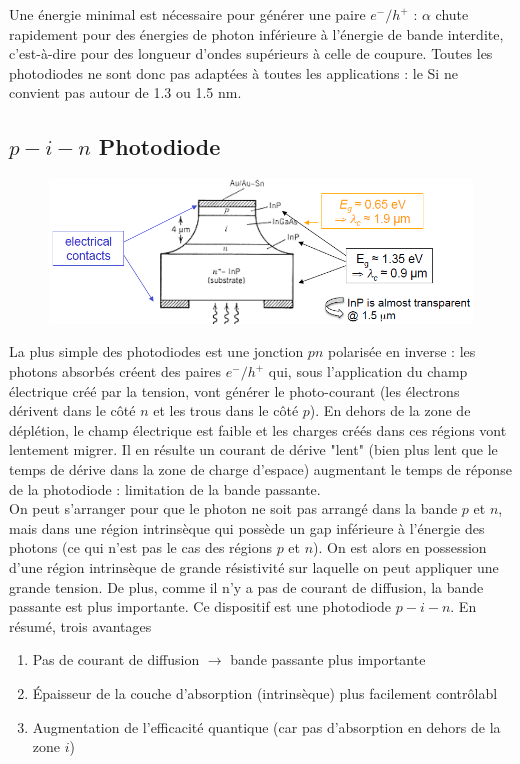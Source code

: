 Une énergie minimal est nécessaire pour générer une paire $e^-/h^+$ : $\alpha$ chute rapidement 
pour des énergies de photon inférieure à l'énergie de bande interdite, c'est-à-dire pour des 
longueur d'ondes supérieurs à celle de coupure. Toutes les photodiodes ne sont donc pas adaptées
à toutes les applications : le Si ne convient pas autour de 1.3 ou 1.5 nm.

\newpage
\subsection{$p-i-n$ Photodiode}
\begin{figure}
\vspace{-5mm}
\includegraphics[scale=0.5]{ch5/image5}
\end{figure}
La plus simple des photodiodes est une jonction $pn$ polarisée en inverse : les photons absorbés
créent des paires $e^-/h^+$ qui, sous l'application du champ électrique créé par la tension, vont
générer le photo-courant (les électrons dérivent dans le côté $n$ et les trous dans le côté $p$). 
En dehors de la zone de déplétion, le champ électrique est faible et les charges créés dans ces
régions vont lentement migrer. Il en résulte un courant de dérive "lent" (bien plus lent que le 
temps de dérive dans la zone de charge d'espace) augmentant le temps de réponse de la photodiode :
limitation de la bande passante.\\

On peut s'arranger pour que le photon ne soit pas arrangé dans la bande $p$ et $n$, mais dans
une région intrinsèque qui possède un gap inférieure à l'énergie des photons (ce qui n'est pas
le cas des régions $p$ et $n$). On est alors en possession d'une région intrinsèque de grande
résistivité sur laquelle on peut appliquer une grande tension. De plus, comme il n'y a pas de 
courant de diffusion, la bande passante est plus importante. Ce dispositif est une photodiode
$p-i-n$. En résumé, trois avantages
\begin{enumerate}
\item Pas de courant de diffusion $\to$ bande passante plus importante
\item Épaisseur de la couche d'absorption (intrinsèque) plus facilement contrôlabl
\item Augmentation de l'efficacité quantique (car pas d'absorption en dehors de la zone $i$)
\end{enumerate}


